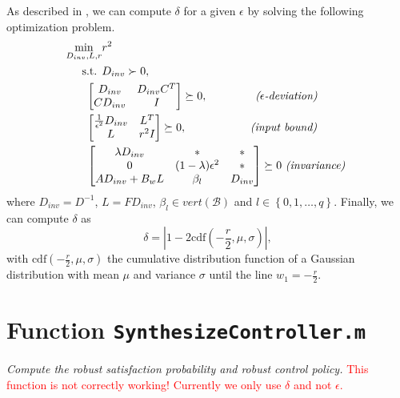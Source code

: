 \documentclass[10pt, onecolumn]{IEEEconf}%
\theoremstyle{definition}
\begin{document}
As described in \cite{Huijgevoort2020similarity}, we can compute $\delta$ for a given $\epsilon$ by solving the following optimization problem.
\begin{subequations}\label{eq:optimProbTot}\begin{align}
 \min\limits_{D_{inv}, L, r}&  r^2   \label{eq:optimProb2}\\
 \text{ s.t. }& D_{inv} \succ 0, \vspace{4pt} \notag\\
& \hspace{-.5cm}\begin{bmatrix}
D_{inv} & D_{inv}C^T \\
CD_{inv} & I
\end{bmatrix} \succeq 0,  \hspace{1.5cm}\mbox{\itshape ($\epsilon$-deviation) }\label{eq:c_approx}\\
& \hspace{-.5cm}\begin{bmatrix}
\frac{1}{\epsilon^2}D_{inv} & L^T \\
L  &r^2 I
\end{bmatrix}\succeq 0,\hspace{2cm}\mbox{\itshape  (input bound) } \label{eq:c_gamma}\\
&  \hspace{-.5cm}\begin{bmatrix}
\lambda D_{inv} & \ast & \ast \\
0 & (1-\lambda)\epsilon^2 &\ast \\
AD_{inv}+B_wL& \beta_l & D_{inv}
\end{bmatrix} \succeq 0 \label{eq:c_invariance}  \mbox{  \itshape  (invariance)  }
\end{align}\end{subequations} where $D_{inv} = D^{-1}$, $L=FD_{inv}$, $\beta_l \in vert(\mathscr{B})$ and \mbox{$l \in \left\{0,1, \dots, q \right\}$.} Finally, we can compute $\delta$ as %
\begin{equation}
\delta = | 1-2\textrm{cdf}(-\frac{r}{2},\mu,\sigma) |,
\end{equation} with $\textrm{cdf}(-\frac{r}{2},\mu,\sigma)$ the cumulative distribution function of a Gaussian distribution with mean $\mu$ and variance $\sigma$ until the line $w_1 = -\frac{r}{2}$.

\section*{Function \texttt{SynthesizeController.m}}
\textit{Compute the robust satisfaction probability and robust control policy.} \textcolor{red}{This function is not correctly working! Currently we only use $\delta$ and not $\epsilon$.} \medskip
\end{document}
